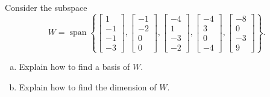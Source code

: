 
\begin{exerciseStatement}


Consider the subspace \[W=\operatorname{span}  \left\{ \left[\begin{array}{c}
1 \\
-1 \\
-1 \\
-3
\end{array}\right] , \left[\begin{array}{c}
-1 \\
-2 \\
0 \\
0
\end{array}\right] , \left[\begin{array}{c}
-4 \\
1 \\
-3 \\
-2
\end{array}\right] , \left[\begin{array}{c}
-4 \\
3 \\
0 \\
-4
\end{array}\right] , \left[\begin{array}{c}
-8 \\
0 \\
-3 \\
9
\end{array}\right] \right\} .\]


\begin{enumerate}[(a)]
\item  Explain how to find a basis of \(W\).
\item  Explain how to find the dimension of \(W\).
\end{enumerate}
    
\end{exerciseStatement}
    
